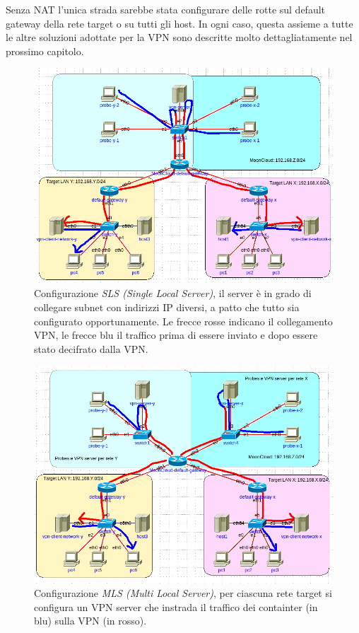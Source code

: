 Senza NAT l'unica strada sarebbe stata configurare delle rotte sul default gateway
della rete target o su tutti gli host. In ogni caso, questa assieme a tutte
le altre soluzioni adottate per la VPN sono descritte molto dettagliatamente
nel prossimo capitolo.

\begin{figure}
  \includegraphics[scale=0.35]{img/sls}
  \caption[Configurazione \textit{SLS (Single Local Server)}]{Configurazione \textit{SLS (Single Local Server)},
  il server è in grado di collegare subnet con indirizzi IP diversi, a patto che tutto
  sia configurato opportunamente. Le frecce rosse indicano il collegamento VPN, le frecce blu il traffico prima di essere inviato
  e dopo essere stato decifrato dalla VPN.}
\end{figure}

\begin{figure}
  \includegraphics[scale=0.4]{img/mls}
  \caption[Configurazione \textit{MLS (Multi Local Server)}]{Configurazione \textit{MLS (Multi Local Server)},
  per ciascuna rete target si configura un VPN server che instrada il traffico dei containter (in blu) sulla VPN (in rosso).}
\end{figure}

